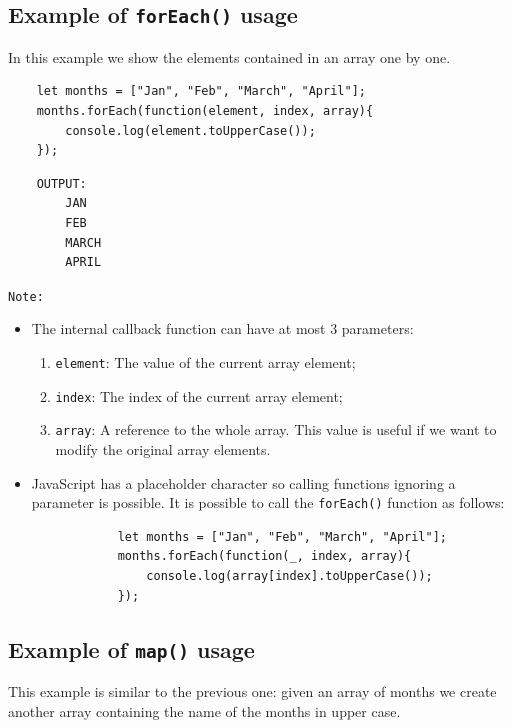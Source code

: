 \documentclass{scrbook}
\begin{document}
\subsection{Example of \texttt{forEach()} usage}

In this example we show the elements contained in an array one by one.

\begin{lstlisting}
    let months = ["Jan", "Feb", "March", "April"];
    months.forEach(function(element, index, array){
        console.log(element.toUpperCase());
    });
\end{lstlisting}

\begin{lstlisting}
    OUTPUT:
        JAN
        FEB
        MARCH
        APRIL
\end{lstlisting}

\noindent
\texttt{Note:} 
    \begin{itemize}
        \item 
        The internal callback function can have at most 3 parameters:
        \begin{enumerate}
            \item \texttt{element}: The value of the current array element;
            \item \texttt{index}: The index of the current array element;
            \item \texttt{array}: A reference to the whole array. This value is useful if we want to modify the original array elements.
        \end{enumerate}

        \item
        JavaScript has a placeholder character so calling functions ignoring a parameter is possible. It is possible to call the \texttt{forEach()} function as follows:
        \begin{lstlisting}
            let months = ["Jan", "Feb", "March", "April"];
            months.forEach(function(_, index, array){
                console.log(array[index].toUpperCase());
            });
        \end{lstlisting}
    \end{itemize}


\subsection{Example of \texttt{map()} usage}

This example is similar to the previous one: given an array of months we create another array containing the name of the months in upper case.
\end{document}
